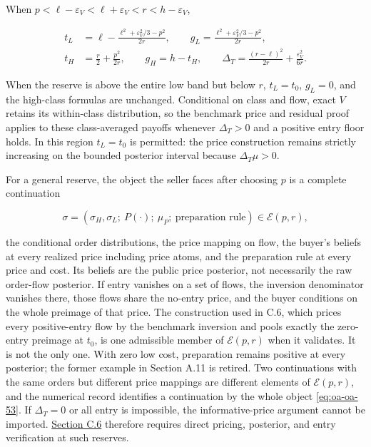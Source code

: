 \documentclass[
  11pt,
]{article}
\begin{document}
When \(p<\ell-\varepsilon_V<\ell+\varepsilon_V<r<h-\varepsilon_V\),

\[
\begin{aligned}
t_L&=\ell-\frac{\ell^2+\varepsilon_V^2/3-p^2}{2r},\qquad
g_L=\frac{\ell^2+\varepsilon_V^2/3-p^2}{2r},\\
t_H&=\frac r2+\frac{p^2}{2r},\qquad g_H=h-t_H,\qquad
\Delta_T=\frac{(r-\ell)^2}{2r}+\frac{\varepsilon_V^2}{6r}.
\end{aligned}
\tag{OA.52}\label{eq:oa-oa-52}
\]

When the reserve is above the entire low band but below \(r\),
\(t_L=t_0\), \(g_L=0\), and the high-class formulas are unchanged.
Conditional on class and flow, exact \(V\) retains its within-class
distribution, so the benchmark price and residual proof applies to these
class-averaged payoffs whenever \(\Delta_T>0\) and a positive entry
floor holds. In this region \(t_L=t_0\) is permitted: the price
construction remains strictly increasing on the bounded posterior
interval because \(\Delta_T\mu>0\).

For a general reserve, the object the seller faces after choosing \(p\)
is a complete continuation

\[
\sigma=(\sigma_H,\sigma_L;\ P(\cdot);\ \mu_P;\ \text{preparation rule})\in\mathcal E(p,r),
\tag{OA.53}\label{eq:oa-oa-53}
\]

the conditional order distributions, the price mapping on flow, the
buyer's beliefs at every realized price including price atoms, and the
preparation rule at every price and cost. Its beliefs are the public
price posterior, not necessarily the raw order-flow posterior. If entry
vanishes on a set of flows, the inversion denominator vanishes there,
those flows share the no-entry price, and the buyer conditions on the
whole preimage of that price. The construction used in C.6, which prices
every positive-entry flow by the benchmark inversion and pools exactly
the zero-entry preimage at \(t_0\), is one admissible member of
\(\mathcal E(p,r)\) when it validates. It is not the only one. With zero
low cost, preparation remains positive at every posterior; the former
example in Section A.11 is retired. Two continuations with the same
orders but different price mappings are different elements of
\(\mathcal E(p,r)\), and the numerical record identifies a continuation
by the whole object \eqref{eq:oa-oa-53}. If \(\Delta_T=0\) or all entry
is impossible, the informative-price argument cannot be imported.
\hyperref[oa-c-reserve]{Section C.6} therefore requires direct pricing,
posterior, and entry verification at such reserves.
\end{document}
